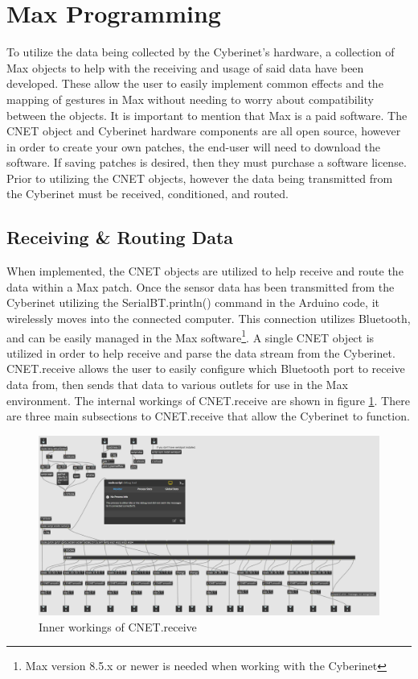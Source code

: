 \section{Max Programming}

To utilize the data being collected by the Cyberinet’s hardware, a collection of Max objects to help with the receiving and usage of said data have been developed. These allow the user to easily implement common effects and the mapping of gestures in Max without needing to worry about compatibility between the objects. It is important to mention that Max is a paid software. The CNET object and Cyberinet hardware components are all open source, however in order to create your own patches, the end-user will need to download the software. If saving patches is desired, then they must purchase a software license. Prior to utilizing the CNET objects, however the data being transmitted from the Cyberinet must be received, conditioned, and routed.

\subsection{Receiving \& Routing Data}

When implemented, the CNET objects are utilized to help receive and route the data within a Max patch. Once the sensor data has been transmitted from the Cyberinet utilizing the SerialBT.println() command in the Arduino code, it wirelessly moves into the connected computer. This connection utilizes Bluetooth, and can be easily managed in the Max software\footnote{Max version 8.5.x or newer is needed when working with the Cyberinet}. A single CNET object is utilized in order to help receive and parse the data stream from the Cyberinet. CNET.receive allows the user to easily configure which Bluetooth port to receive data from, then sends that data to various outlets for use in the Max environment. The internal workings of CNET.receive are shown in figure \ref{fig:cnet.receive}. There are three main subsections to CNET.receive that allow the Cyberinet to function.


\begin{center}
    \begin{figure}
        \centering
        \includegraphics[scale=0.48, angle=270]{diagrams/maxPatches/CNET.receive.png}
        \caption{Inner workings of CNET.receive}
        \label{fig:cnet.receive}
    \end{figure}
\end{center}

